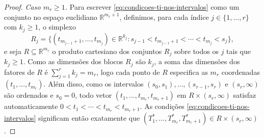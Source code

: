 \documentclass[12pt,portuguese]{article}
\theoremstyle{definition}
\theoremstyle{plainexercise}
\theoremstyle{starredexercise}
\theoremstyle{definition}
\begin{document}
\begin{proof}
\smallskip
\noindent\emph{Caso $m_r\geqslant1$.}
Para escrever \eqref{eq:condicoes-ti-nos-intervalos} como um conjunto no espaço
euclidiano $\mathbb{R}^{m_r+1}$, definimos, para cada índice $j\in\{1,\ldots,r\}$
com $k_j\geqslant1$, o simplexo
\[
  R_j=\bigl\{(t_{m_{j-1}+1},\ldots,t_{m_j})\in\mathbb{R}^{k_j} :
    s_{j-1}<t_{m_{j-1}+1}<\cdots<t_{m_j}<s_j\bigr\},
\]
e seja $R\subseteq\mathbb{R}^{m_r}$ o produto cartesiano dos conjuntos $R_j$
sobre todos os $j$ tais que $k_j\geqslant1$. Como as dimensões dos blocos $R_j$
são $k_j$, a soma das dimensões dos fatores de $R$ é $\sum_{j=1}^r k_j=m_r$,
logo cada ponto de $R$ especifica as $m_r$ coordenadas $(t_1,\ldots,t_{m_r})$.
Além disso, como os intervalos $(s_0,s_1),\ldots,(s_{r-1},s_r)$ e $(s_r,\infty)$
são ordenados e $s_0=0$, todo vetor $(t_1,\ldots,t_{m_r},t_{m_r+1})$ em
$R\times(s_r,\infty)$ satisfaz automaticamente
$0<t_1<\cdots<t_{m_r}<t_{m_r+1}$. As condições \eqref{eq:condicoes-ti-nos-intervalos}
significam então exatamente que
$(T_1^*,\ldots,T_{m_r}^*,T_{m_r+1}^*)\in R\times(s_r,\infty)$.


\end{proof}
\end{document}

